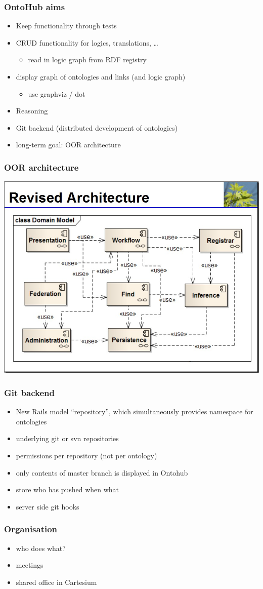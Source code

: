 \documentclass[german]{beamer}
\begin{document}
\begin{frame}
\frametitle{OntoHub aims}
\begin{itemize}
\item Keep functionality through tests
\item CRUD functionality for logics, translations, \ldots
\begin{itemize}
\item read in logic graph from RDF registry
\end{itemize}
\item display graph of ontologies and links (and logic graph)
\begin{itemize}
\item use graphviz / dot
\end{itemize}
\item Reasoning
\item Git backend (distributed development of ontologies)
\item long-term goal: OOR architecture
\end{itemize}
\end{frame}


\begin{frame}
\frametitle{OOR architecture}
\includegraphics[width=\textwidth]{revised-OOR-architecture-proposal--ToddSchneider-KenBaclawski_20101119.jpg}
\end{frame}


\begin{frame}
\frametitle{Git backend}
\begin{itemize}
\item New Rails model ``repository'', which simultaneously provides namespace for ontologies
\item underlying git or svn repositories
\item permissions per repository (not per ontology)
\item only contents of master branch is displayed in Ontohub
\item store who has pushed when what
\item server side git hooks
\end{itemize}
\end{frame}

\begin{frame}
\frametitle{Organisation}
\begin{itemize}
\item who does what?
\item meetings
\item shared office in Cartesium
\end{itemize}
\end{frame}
\end{document}
